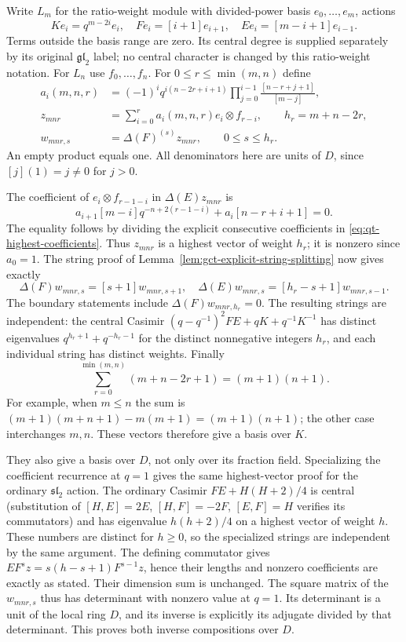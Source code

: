 Write $L_m$ for the ratio-weight module with divided-power basis
$e_0,\ldots,e_m$, actions
\[
 Ke_i=q^{m-2i}e_i,\quad Fe_i=[i+1]e_{i+1},\quad
 Ee_i=[m-i+1]e_{i-1}.
\]
Terms outside the basis range are zero. Its central degree is supplied
separately by its original $\mathfrak{gl}_2$ label; no central
character is changed by this ratio-weight notation. For $L_n$ use
$f_0,\ldots,f_n$. For $0\le r\le\min(m,n)$ define
\begin{align}
 a_i(m,n,r)&=(-1)^i q^{i(n-2r+i+1)}
       \prod_{j=0}^{i-1}\frac{[n-r+j+1]}{[m-j]},\label{eq:qt-highest-coefficients}\\
 z_{mnr}&=\sum_{i=0}^r a_i(m,n,r)e_i\otimes f_{r-i},\qquad
 h_r=m+n-2r,\nonumber\\
 w_{mnr,s}&=\Delta(F)^{(s)}z_{mnr},\qquad 0\le s\le h_r.
 \label{eq:qt-clebsch-strings}
\end{align}
An empty product equals one. All denominators here are units of $D$,
since $[j](1)=j\ne0$ for $j>0$.

The coefficient of $e_i\otimes f_{r-1-i}$ in $\Delta(E)z_{mnr}$ is
\[
 a_{i+1}[m-i]q^{-n+2(r-1-i)}+a_i[n-r+i+1]=0.
\]
The equality follows by dividing the explicit consecutive coefficients
in \eqref{eq:qt-highest-coefficients}. Thus $z_{mnr}$ is a highest
vector of weight $h_r$; it is nonzero since $a_0=1$.
The string proof of Lemma~\ref{lem:gct-explicit-string-splitting}
now gives exactly
\[
 \Delta(F)w_{mnr,s}=[s+1]w_{mnr,s+1},\quad
 \Delta(E)w_{mnr,s}=[h_r-s+1]w_{mnr,s-1}.
\]
The boundary statements include $\Delta(F)w_{mnr,h_r}=0$.
The resulting strings are independent: the central Casimir
$(q-q^{-1})^2FE+qK+q^{-1}K^{-1}$ has distinct eigenvalues
$q^{h_r+1}+q^{-h_r-1}$ for the distinct nonnegative integers $h_r$,
and each individual string has distinct weights. Finally
\[
 \sum_{r=0}^{\min(m,n)}(m+n-2r+1)=(m+1)(n+1).
\]
For example, when $m\le n$ the sum is
$(m+1)(m+n+1)-m(m+1)=(m+1)(n+1)$; the other case interchanges
$m,n$. These vectors therefore give a basis over $K$.

They also give a basis over $D$, not only over its fraction field.
Specializing the coefficient recurrence at $q=1$ gives the same
highest-vector proof for the ordinary $\mathfrak{sl}_2$ action.
The ordinary Casimir $FE+H(H+2)/4$ is central (substitution of
$[H,E]=2E$, $[H,F]=-2F$, $[E,F]=H$ verifies its commutators)
and has eigenvalue $h(h+2)/4$ on a highest vector of weight $h$.
These numbers are distinct for $h\ge0$, so the specialized strings
are independent by the same argument. The defining commutator gives
$EF^sz=s(h-s+1)F^{s-1}z$, hence their lengths and nonzero
coefficients are exactly as stated. Their dimension sum is unchanged.
The square matrix of the $w_{mnr,s}$ thus has determinant with
nonzero value at $q=1$. Its determinant is a unit of the local ring
$D$, and its inverse is explicitly its adjugate divided by that
determinant. This proves both inverse compositions over $D$.

